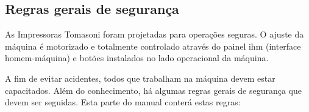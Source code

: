 \subsection{Regras gerais de segurança}
As Impressoras Tomasoni foram projetadas para operações seguras. O ajuste da máquina é motorizado e
totalmente controlado através do painel ihm (interface homem-máquina) e botões instalados no lado operacional da máquina.

A fim de evitar acidentes, todos que trabalham na máquina devem estar capacitados. Além do conhecimento, há
algumas regras gerais de segurança que devem ser seguidas. Esta parte do manual conterá estas regras:


